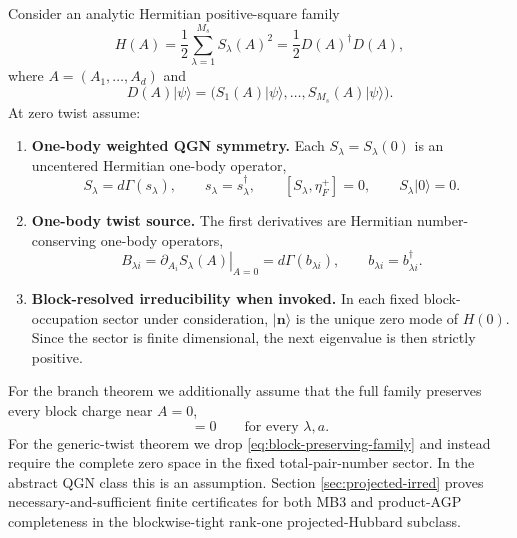 \documentclass[11pt]{article}
\numberwithin{equation}{section}
\newcommand{\bn}{\mathbf n}
\begin{document}
Consider an analytic Hermitian positive-square family
\begin{equation}
 H(A)=\frac12\sum_{\lambda=1}^{M_s}S_\lambda(A)^2
 =\frac12D(A)^\dagger D(A),
 \label{eq:H-family}
\end{equation}
where $A=(A_1,\ldots,A_d)$ and
\begin{equation}
 D(A)|\psi\rangle
 =\bigl(S_1(A)|\psi\rangle,\ldots,S_{M_s}(A)|\psi\rangle\bigr).
 \label{eq:D-def}
\end{equation}
At zero twist assume:

\begin{enumerate}[label=\textbf{MB\arabic*.},leftmargin=4.6em]
\item \textbf{One-body weighted QGN symmetry.}
Each $S_\lambda=S_\lambda(0)$ is an uncentered Hermitian one-body operator,
\begin{equation}
 S_\lambda=d\Gamma(s_\lambda),
 \qquad
 s_\lambda=s_\lambda^\dagger,
 \qquad
 [S_\lambda,\eta_F^+]=0,
 \qquad
 S_\lambda|0\rangle=0.
 \label{eq:MB1}
\end{equation}

\item \textbf{One-body twist source.}
The first derivatives are Hermitian number-conserving one-body operators,
\begin{equation}
 B_{\lambda i}
 =\left.\partial_{A_i}S_\lambda(A)\right|_{A=0}
 =d\Gamma(b_{\lambda i}),
 \qquad
 b_{\lambda i}=b_{\lambda i}^\dagger.
 \label{eq:MB2}
\end{equation}

\item \textbf{Block-resolved irreducibility when invoked.}
In each fixed block-occupation sector under consideration, $|\bn\rangle$ is the unique zero mode of $H(0)$.  Since the sector is finite dimensional, the next eigenvalue is then strictly positive.
\label{item:MB3}
\end{enumerate}

For the branch theorem we additionally assume that the full family preserves every block charge near $A=0$,
\begin{equation}
 [S_\lambda(A),N_a]=0
 \qquad
 \text{for every }\lambda,a.
 \label{eq:block-preserving-family}
\end{equation}
For the generic-twist theorem we drop \eqref{eq:block-preserving-family} and instead require the complete zero space in the fixed total-pair-number sector.  In the abstract QGN class this is an assumption.  Section \ref{sec:projected-irred} proves necessary-and-sufficient finite certificates for both MB3 and product-AGP completeness in the blockwise-tight rank-one projected-Hubbard subclass.
\end{document}
